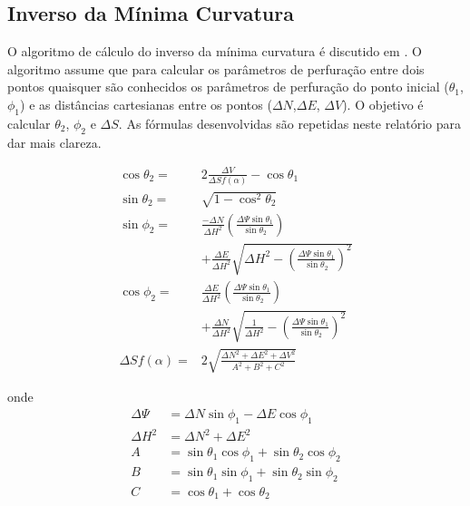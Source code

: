\documentclass[final,5p]{elsarticle}
\numberwithin{equation}{section}
\begin{document}
\subsection{Inverso da Mínima Curvatura}

O algoritmo de cálculo do inverso da mínima curvatura é discutido em \cite{relatoriobisseccao}. O algoritmo assume que para calcular os parâmetros de perfuração entre dois pontos quaisquer são conhecidos os parâmetros de perfuração do ponto inicial ($\theta_1$, $\phi_1$) e as distâncias cartesianas entre os pontos ($\Delta N$,$\Delta E$, $\Delta V$). O objetivo é calcular $\theta_2$, $\phi_2$ e $\Delta S$. As fórmulas desenvolvidas são repetidas neste relatório para dar mais clareza.

\begin{subequations}\label{eq:inversomcm}
    \begin{align}
        \cos \theta_2 =& 2 \frac{\Delta V}{\Delta S f(\alpha)} - \cos \theta_1 \label{eq:costheta2} \\
        \sin \theta_2 =& \sqrt{1 - \cos^2 \theta_2} \label{eq:sintheta2} \\
        \sin \phi_2 =& \frac{-\Delta N}{\Delta H^2} \left( \frac{\Delta \Psi \sin \theta_1}{\sin \theta_2} \right) \nonumber \\
        & + \frac{\Delta E}{\Delta H^2} \sqrt{\Delta H^2 - \left( \frac{\Delta \Psi \sin \theta_1}{\sin \theta_2} \right)^2} \label{eq:sinphi2} \\
        \cos \phi_2 =& \frac{\Delta E}{\Delta H^2} \left( \frac{\Delta \Psi \sin \theta_1}{\sin \theta_2} \right) \nonumber \\
        & + \frac{\Delta N}{\Delta H^2} \sqrt{\frac{1}{\Delta H^2} - \left( \frac{\Delta \Psi \sin \theta_1}{\sin \theta_2} \right)^2} \label{eq:cosphi2} \\
        \Delta S f(\alpha) =& 2 \sqrt{\frac{\Delta N^2 + \Delta E^2 + \Delta V^2}{A^2+B^2+C^2}} \label{eq:DeltaSfa}
    \end{align}
\end{subequations}

onde
\begin{align*}
    \Delta \Psi &= \Delta N \sin \phi_1 - \Delta E \cos \phi_1 \\
    \Delta H^2 &= \Delta N^2 + \Delta E^2 \\
    A &= \sin \theta_1 \cos \phi_1 + \sin \theta_2 \cos \phi_2 \\
    B &= \sin \theta_1 \sin \phi_1 + \sin \theta_2 \sin \phi_2 \\
    C &= \cos \theta_1 + \cos \theta_2
\end{align*}
\end{document}
